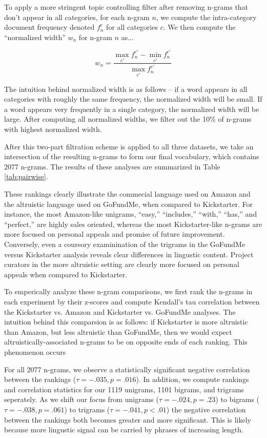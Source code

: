 \documentclass[letterpaper]{article}
\begin{document}
To apply a more stringent topic controlling filter after removing n-grams that don't appear in all categories, for each n-gram $n$, we compute the intra-category document frequency denoted $f_n^c$ for all categories $c$. We then compute the ``normalized width'' $w_n$ for n-gram $n$ as...

\begin{equation} \label{eq:width}
w_n = \frac{\max\limits_{c'}f_n^{c'} - \min\limits_{c'}f_n^{c'}}{\max\limits_{c'}f_n^{c'}}
\end{equation}

The intuition behind normalized width is as follows -- if a word appears in all categories with roughly the same frequency, the normalized width will be small. If a word appears very frequently in a single category, the normalized width will be large. After computing all normalized widths, we filter out the 10\% of n-grams with highest normalized width.

After this two-part filtration scheme is applied to all three datasets, we take an intersection of the resulting n-grams to form our final vocabulary, which contains 2077 n-grams. The results of these analyses are summarized in Table \ref{tab:pairwise}.

These rankings clearly illustrate the commecial language used on Amazon and the altruistic language used on GoFundMe, when compared to Kickstarter. For instance, the most Amazon-like unigrams, ``easy,'' ``includes,'' ``with,'' ``has,'' and ``perfect,'' are highly sales oriented, whereas the most Kickstarter-like n-grams are more focused on personal appeals and promise of future improvement. Conversely, even a coursory examinination of the trigrams in the GoFundMe versus Kickstarter analysis reveals clear differences in lingustic content. Project curators in the more altruistic setting are clearly more focused on personal appeals when compared to Kickstarter.

To emperically analyze these n-gram comparisons, we first rank the n-grams in each experiment by their z-scores and compute Kendall's tau correlation between the Kickstarter vs. Amazon and Kickstarter vs. GoFundMe analyses. The intuition behind this comparsion is as follows: if Kickstarter is more altruistic than Amazon, but less altruistic than GoFundMe, then we would expect altruistically-associated n-grams to be on opposite ends of each ranking. This phenomenon occurs 

For all 2077 n-grams, we observe a statistically significant negative correlation between the rankings ($\tau = -.035, p = .016$). In addition, we compute rankings and correlation statistics for our 1119 unigrams, 1101 bigrams, and trigrams seperately. As we shift our focus from unigrams ($\tau = -.024, p = .23$) to bigrams ($\tau = -.038, p = .061$) to trigrams ($\tau = -.041, p < .01$) the negative correlation between the rankings both becomes greater and more significant. This is likely because more lingustic signal can be carried by phrases of increasing length.
\end{document}
